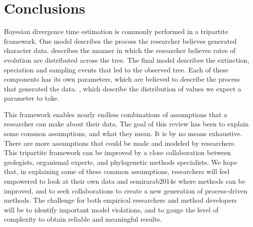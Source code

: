 
\section{Conclusions}

Bayesian divergence time estimation is commonly performed in a tripartite framework.
One model describes the process the researcher believes generated  character data.
 describes the manner in which the researcher believes rates of evolution are distributed across the tree.
The final model describes the extinction, speciation and sampling events that  led to the observed tree.
Each of these components has its own parameters, which are believed to describe the process that generated the data.
, which describe the distribution of values we expect a parameter to take.

This framework enables nearly endless combinations of assumptions that a researcher can make about their data.
The goal of this review has been to explain some common assumptions, and what they mean.
It is by no means exhaustive.
There are more assumptions that could be made and modeled by researchers.
This tripartite framework can be improved by a close collaboration between geologists, organismal experts, and phylogenetic methods specialists.
We hope that, in explaining some of these common assumptions, researchers will feel empowered to look at their own data and semirarab2014e where methods can be improved, and to seek collaborations to create a new generation of process-driven methods. The challenge for both empirical researchers and method developers will be to identify important model violations, and to gauge the level of complexity  to obtain reliable and meaningful results.

